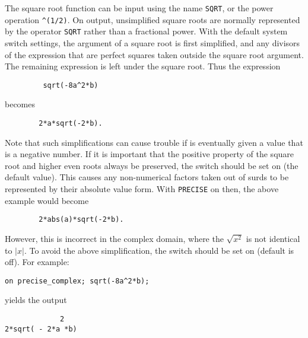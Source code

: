 The square root function can be input using the name \texttt{SQRT}, or the
power operation \texttt{\textasciicircum(1/2)}.  On output, unsimplified
square roots
are normally represented by the operator \texttt{SQRT} rather than a
fractional power.  With the default system switch settings, the argument
of a square root is first simplified, and any divisors of the expression
that are perfect squares taken outside the square root argument.  The
remaining expression is left under the square root.
Thus the expression
\begin{verbatim}
         sqrt(-8a^2*b)
 \end{verbatim}
becomes
\begin{verbatim}
        2*a*sqrt(-2*b).
\end{verbatim}

\hypertarget{switch:PRECISE}{}
Note that such simplifications can cause trouble if  is eventually
given a value that is a negative number.  If it is important that the
positive property of the square root and higher even roots always be
preserved, the switch  should be set on
(the default value).
This causes any non-numerical factors taken out of surds to be represented
by their absolute value form.
With %
\texttt{PRECISE} on then, the above example would become
\begin{verbatim}
        2*abs(a)*sqrt(-2*b).
\end{verbatim}

\hypertarget{switch:PRECISE_COMPLEX}{} 
However, this is incorrect in the complex domain, where the
$\sqrt{x^{2}}$ is not identical to $|x|$. To avoid the above
simplification, the switch
 should be set on
(default is off). For example:
\begin{verbatim}
on precise_complex; sqrt(-8a^2*b);
\end{verbatim}
yields the output
\begin{verbatim}
             2
2*sqrt( - 2*a *b)
\end{verbatim}

